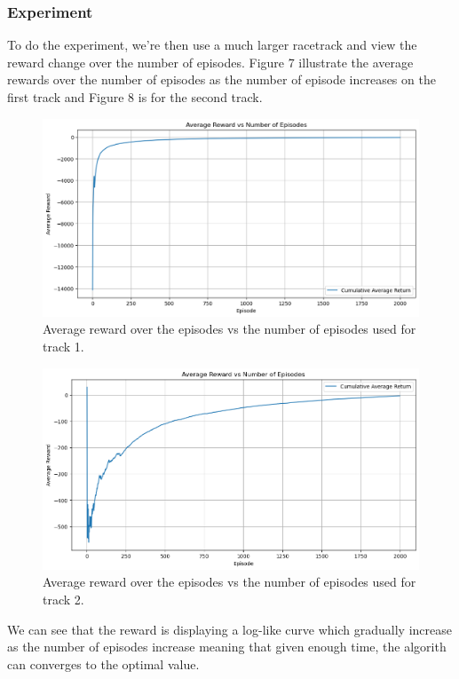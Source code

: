 \documentclass{article}
\begin{document}
\subsubsection{Experiment}

To do the experiment, we're then use a much larger racetrack and view the reward
change over the number of episodes. Figure 7 illustrate the average rewards over
the number of episodes as the number of episode increases on the first track and
Figure 8 is for the second track.

\begin{figure}[h!]
\centering
\includegraphics[scale=0.5]{./images/exp_mc_racetrack1.png}
\caption{Average reward over the episodes vs the number of episodes used for
track 1.}
\label{fig:exp_mc_racetrack1}
\end{figure}

\begin{figure}[h!]
\centering
\includegraphics[scale=0.5]{./images/exp_mc_racetrack2.png}
\caption{Average reward over the episodes vs the number of episodes used for
track 2.}
\label{fig:exp_mc_racetrack2}
\end{figure}

We can see that the reward is displaying a log-like curve which gradually increase as the number of episodes
increase meaning that given enough time, the algorith can converges to the
optimal value. 
\end{document}
